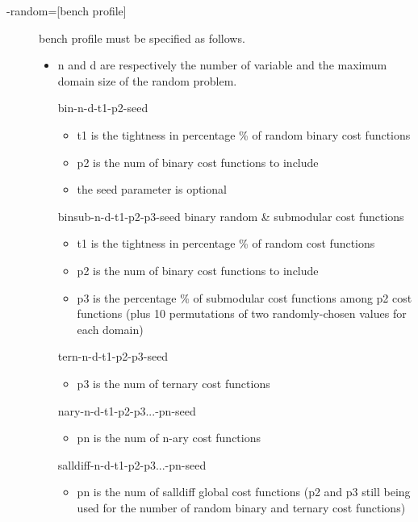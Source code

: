 \documentclass{article}
\begin{document}
\begin{description}
\item[{-random=[bench profile]}]
  bench profile must be specified as follows.
  \begin{itemize}
  \item n and d are respectively the number of variable and the
    maximum domain size of the random problem.
			
    bin-{n}-{d}-{t1}-{p2}-{seed}
    \begin{itemize}
    \item t1 is the tightness in percentage \% of random binary cost functions
    \item p2 is the num of binary cost functions to include
    \item the seed parameter is optional
    \end{itemize}   

    binsub-{n}-{d}-{t1}-{p2}-{p3}-{seed} binary random \& submodular cost functions       
    \begin{itemize}
      \item t1 is the tightness in percentage \% of random cost functions
      \item  p2 is the num of binary cost functions to include
      \item p3 is the percentage \% of submodular cost functions among p2 cost functions
        (plus 10 permutations of two randomly-chosen values for each domain)
      \end{itemize}
                                                                                   
       tern-{n}-{d}-{t1}-{p2}-{p3}-{seed} 
       \begin{itemize}
       \item p3 is the num of ternary cost functions
       \end{itemize}
       

      nary-{n}-{d}-{t1}-{p2}-{p3}...-{pn}-{seed}
       \begin{itemize}
       \item pn is the num of n-ary cost functions
       \end{itemize}

       salldiff-{n}-{d}-{t1}-{p2}-{p3}...-{pn}-{seed}  
       \begin{itemize}
       \item pn is the num of salldiff global cost functions (p2 and
         p3 still being used for the number of random binary and
         ternary cost functions)
       \end{itemize}
     \end{itemize}
   \end{description}
    
\end{document}
